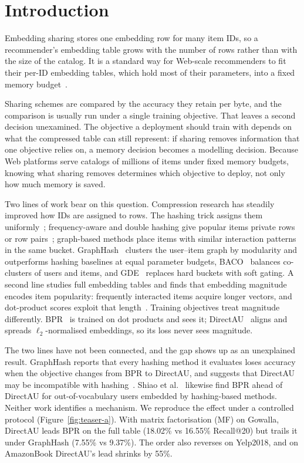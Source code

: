 \section{Introduction}\label{sec:intro}

Embedding sharing stores one embedding row for many item IDs, so a recommender's embedding table grows with the number of rows rather than with the size of the catalog. It is a standard way for Web-scale recommenders to fit their per-ID embedding tables, which hold most of their parameters, into a fixed memory budget~\cite{naumov2019dlrm,wu2025graphhash}.

Sharing schemes are compared by the accuracy they retain per byte, and the comparison is usually run under a single training objective. That leaves a second decision unexamined. The objective a deployment should train with depends on what the compressed table can still represent: if sharing removes information that one objective relies on, a memory decision becomes a modelling decision. Because Web platforms serve catalogs of millions of items under fixed memory budgets, knowing what sharing removes determines which objective to deploy, not only how much memory is saved.

Two lines of work bear on this question. Compression research has steadily improved how IDs are assigned to rows. The hashing trick assigns them uniformly~\cite{weinberger2009hashing}; frequency-aware and double hashing give popular items private rows or row pairs~\cite{zhang2020doublehash}; graph-based methods place items with similar interaction patterns in the same bucket. GraphHash~\cite{wu2025graphhash} clusters the user--item graph by modularity and outperforms hashing baselines at equal parameter budgets, BACO~\cite{jiang2026baco} balances co-clusters of users and items, and GDE~\cite{lee2026gde} replaces hard buckets with soft gating. A second line studies full embedding tables and finds that embedding magnitude encodes item popularity: frequently interacted items acquire longer vectors, and dot-product scores exploit that length~\cite{loveland2025prism,chen2023adaptau,liu2026ddc}. Training objectives treat magnitude differently. BPR~\cite{rendle2009bpr} is trained on dot products and sees it; DirectAU~\cite{wang2022directau} aligns and spreads $\ell_2$-normalised embeddings, so its loss never sees magnitude.

The two lines have not been connected, and the gap shows up as an unexplained result. GraphHash reports that every hashing method it evaluates loses accuracy when the objective changes from BPR to DirectAU, and suggests that DirectAU may be incompatible with hashing~\cite{wu2025graphhash}. Shiao et al.~\cite{shiao2025oov} likewise find BPR ahead of DirectAU for out-of-vocabulary users embedded by hashing-based methods. Neither work identifies a mechanism. We reproduce the effect under a controlled protocol (Figure~\ref{fig:teaser-a}). With matrix factorisation (MF) on Gowalla, DirectAU leads BPR on the full table (18.02\% vs 16.55\% Recall@20) but trails it under GraphHash (7.55\% vs 9.37\%). The order also reverses on Yelp2018, and on AmazonBook DirectAU's lead shrinks by 55\%.

